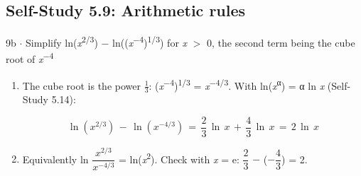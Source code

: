 \documentclass[11pt]{article}
\begin{document}
\begin{keepsection}\subsection{Self-Study 5.9: Arithmetic rules}

\begin{workedbox}{9b \ensuremath{\cdot} Simplify ln(\textit{x}\textsuperscript{2/3}) \ensuremath{-} ln((\textit{x}\textsuperscript{\ensuremath{-}4})\textsuperscript{1/3}) for \textit{x} \ensuremath{>} 0, the second term being the cube root of \textit{x}\textsuperscript{\ensuremath{-}4}}
\begin{enumerate}
\item {}
The cube root is the power \ensuremath{\tfrac13}: (\textit{x}\textsuperscript{\ensuremath{-}4})\textsuperscript{1/3} = \textit{x}\textsuperscript{\ensuremath{-}4/3}. With ln(\textit{x}\textsuperscript{α}) = α ln \textit{x} (Self-Study 5.14):

\begin{equation*}\ln ({x}^{2/3})\, -\, \ln ({x}^{-4/3})\, =\, \dfrac{2}{3}\, \ln \, {x}\, +\, \dfrac{4}{3}\, \ln \, {x}\, =\, 2\, \ln \, {x}\end{equation*}
\item Equivalently ln {\small\ensuremath{\dfrac{{x}^{2/3}}{{x}^{-4/3}}}} = ln(\textit{x}\textsuperscript{2}). Check with \textit{x} = e: {\small\ensuremath{\dfrac{2}{3}}} \ensuremath{-} (\ensuremath{-}{\small\ensuremath{\dfrac{4}{3}}}) = 2.
\end{enumerate}
\end{workedbox}

\end{keepsection}
\end{document}
